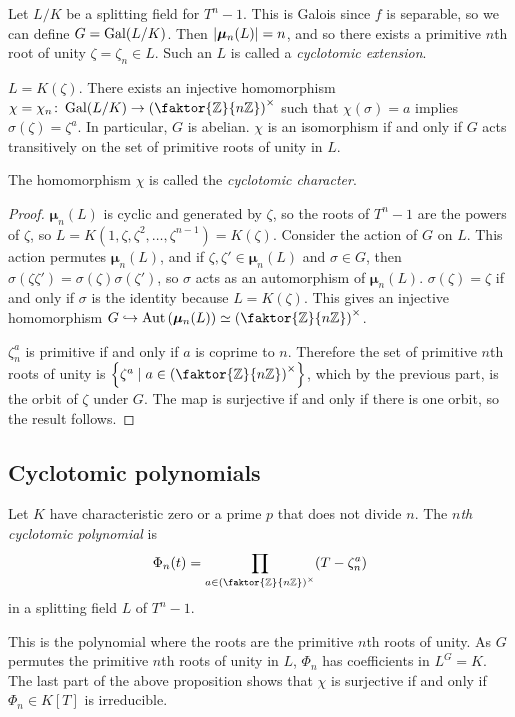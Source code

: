 Let \( L / K \) be a splitting field for \( T^n - 1 \).
This is Galois since \( f \) is separable, so we can define \( G = \operatorname{Gal}(L/K) \).
Then \( \abs{\bm \mu_n(L)} = n \), and so there exists a primitive \( n \)th root of unity \( \zeta = \zeta_n \in L \).
Such an \( L \) is called a \emph{cyclotomic extension}.
\begin{proposition}
	\( L = K(\zeta) \).
	There exists an injective homomorphism \( \chi = \chi_n \colon \Gal(L/K) \to \qty(\faktor{\mathbb Z}{n\mathbb Z})^\times \) such that \( \chi(\sigma) = a \) implies \( \sigma(\zeta) = \zeta^a \).
	In particular, \( G \) is abelian.
	\( \chi \) is an isomorphism if and only if \( G \) acts transitively on the set of primitive roots of unity in \( L \).
\end{proposition}
The homomorphism \( \chi \) is called the \emph{cyclotomic character}.
\begin{proof}
	\( \bm \mu_n(L) \) is cyclic and generated by \( \zeta \), so the roots of \( T^n - 1 \) are the powers of \( \zeta \), so \( L = K(1,\zeta,\zeta^2,\dots,\zeta^{n-1}) = K(\zeta) \).
	Consider the action of \( G \) on \( L \).
	This action permutes \( \bm \mu_n(L) \), and if \( \zeta, \zeta' \in \bm \mu_n(L) \) and \( \sigma \in G \), then \( \sigma(\zeta\zeta') = \sigma(\zeta)\sigma(\zeta') \), so \( \sigma \) acts as an automorphism of \( \bm \mu_n(L) \).
	\( \sigma(\zeta) = \zeta \) if and only if \( \sigma \) is the identity because \( L = K(\zeta) \).
	This gives an injective homomorphism \( G \hookrightarrow \Aut \qty(\bm \mu_n(L)) \simeq \qty(\faktor{\mathbb Z}{n\mathbb Z})^\times \).

	\( \zeta_n^a \) is primitive if and only if \( a \) is coprime to \( n \).
	Therefore the set of primitive \( n \)th roots of unity is \( \qty{\zeta^a \mid a \in \qty(\faktor{\mathbb Z}{n\mathbb Z})^\times} \), which by the previous part, is the orbit of \( \zeta \) under \( G \).
	The map is surjective if and only if there is one orbit, so the result follows.
\end{proof}

\subsection{Cyclotomic polynomials}
\begin{definition}
	Let \( K \) have characteristic zero or a prime \( p \) that does not divide \( n \).
	The \emph{\( n \)th cyclotomic polynomial} is
	\[ \Phi_n(t) = \prod_{a \in \qty(\faktor{\mathbb Z}{n\mathbb Z})^\times} (T - \zeta_n^a) \]
	in a splitting field \( L \) of \( T^n - 1 \).
\end{definition}
This is the polynomial where the roots are the primitive \( n \)th roots of unity.
As \( G \) permutes the primitive \( n \)th roots of unity in \( L \), \( \Phi_n \) has coefficients in \( L^G = K \).
The last part of the above proposition shows that \( \chi \) is surjective if and only if \( \Phi_n \in K[T] \) is irreducible.


